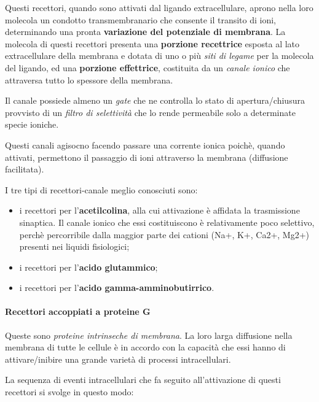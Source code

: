 \documentclass[]{article}
\begin{document}
Questi recettori, quando sono attivati dal ligando extracellulare,
aprono nella loro molecola un condotto transmembranario che consente il
transito di ioni, determinando una pronta \textbf{variazione del
potenziale di membrana}. La molecola di questi recettori presenta una
\textbf{porzione recettrice} esposta al lato extracellulare della
membrana e dotata di uno o più \emph{siti di legame} per la molecola del
ligando, ed una \textbf{porzione effettrice}, costituita da un
\emph{canale ionico} che attraversa tutto lo spessore della membrana.

Il canale possiede almeno un \emph{gate} che ne controlla lo stato di
apertura/chiusura provvisto di un \emph{filtro di selettività} che lo
rende permeabile solo a determinate specie ioniche.

Questi canali agisocno facendo passare una corrente ionica poichè,
quando attivati, permettono il passaggio di ioni attraverso la membrana
(diffusione facilitata).

I tre tipi di recettori-canale meglio conosciuti sono:

\begin{itemize}
\itemsep1pt\parskip0pt
\item
  i recettori per l'\textbf{acetilcolina}, alla cui attivazione è
  affidata la trasmissione sinaptica. Il canale ionico che essi
  costituiscono è relativamente poco selettivo, perchè percorribile
  dalla maggior parte dei cationi (Na+, K+, Ca2+, Mg2+) presenti nei
  liquidi fisiologici;
\item
  i recettori per l'\textbf{acido glutammico};
\item
  i recettori per l'\textbf{acido gamma-amminobutirrico}.
\end{itemize}

\paragraph{Recettori accoppiati a proteine
G}\label{recettori-accoppiati-a-proteine-g}

Queste sono \emph{proteine intrinseche di membrana}. La loro larga
diffusione nella membrana di tutte le cellule è in accordo con la
capacità che essi hanno di attivare/inibire una grande varietà di
processi intracellulari.

La sequenza di eventi intracellulari che fa seguito all'attivazione di
questi recettori si svolge in questo modo:
\end{document}
